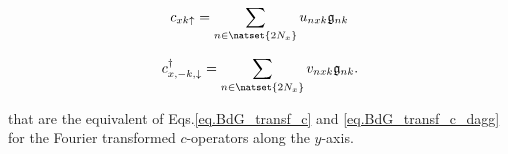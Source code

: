 \documentclass[../main.tex]{subfile}
\begin{document}
\begin{center}
    \begin{minipage}{0.4\textwidth}
    \begin{equation}\label{eq:BdG_transf_c_fourier}
        c_{xk\uparrow} = \sum_{n\in\natset{2N_x}} u_{nxk}\mathfrak{g}_{nk} 
    \end{equation}
    \end{minipage}\hspace{0.05\textwidth}
    \begin{minipage}{0.03\textwidth}
    \end{minipage}
    \begin{minipage}{0.45\textwidth}
        \begin{equation}
        \label{eq:BdG_transf_c_fourier_dagg}
            c_{x,-k,\downarrow}^{\dagger} =\sum_{n\in\natset{2N_x}} v_{nxk}\mathfrak{g}_{nk}. 
        \end{equation}
    \end{minipage}
    \end{center}
that are the equivalent of Eqs.\ref{eq.BdG_transf_c} and \ref{eq.BdG_transf_c_dagg} for the Fourier transformed $c$-operators along the $y$-axis.\\
\end{document}

